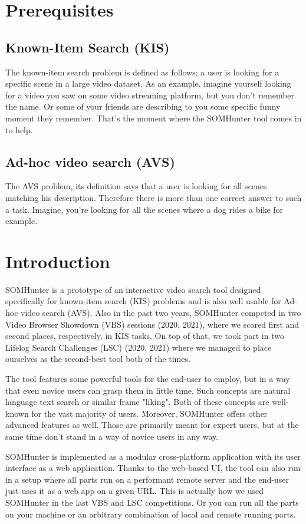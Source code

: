 \chapter{Prerequisites}
\section{Known-Item Search (KIS)}
The known-item search problem is defined as follows; a user is looking for a specific scene in a large video dataset. As an example, imagine yourself looking for a video you saw on some video streaming platform, but you don't remember the name. Or some of your friends are describing to you some specific funny moment they remember. That's the moment where the SOMHunter tool comes in to help. 

\section{Ad-hoc video search (AVS)}
The AVS problem, its definition says that a user is looking for all scenes matching his description. Therefore there is more than one correct answer to such a task. Imagine, you're looking for all the scenes where a dog rides a bike for example.

\chapter{Introduction}

SOMHunter is a prototype of an interactive video search tool designed specifically for known-item search (KIS) problems and is also well usable for Ad-hoc video search (AVS). Also in the past two years, SOMHunter competed in two Video Browser Showdown (VBS) sessions (2020, 2021), where we scored first and second places, respectively, in KIS tasks. On top of that, we took part in two Lifelog Search Challenges (LSC) (2020, 2021) where we managed to place ourselves as the second-best tool both of the times.

The tool features some powerful tools for the end-user to employ, but in a way that even novice users can grasp them in little time. Such concepts are natural language text search or similar frame "liking". Both of these concepts are well-known for the vast majority of users. Moreover,  SOMHunter offers other advanced features as well. Those are primarily meant for expert users, but at the same time don't stand in a way of novice users in any way.

SOMHunter is implemented as a modular cross-platform application with its user interface as a web application. Thanks to the web-based UI, the tool can also run in a setup where all parts run on a performant remote server and the end-user just uses it as a web app on a given URL. This is actually how we used SOMHunter in the last VBS and LSC competitions. Or you can run all the parts on your machine or an arbitrary combination of local and remote running parts.


